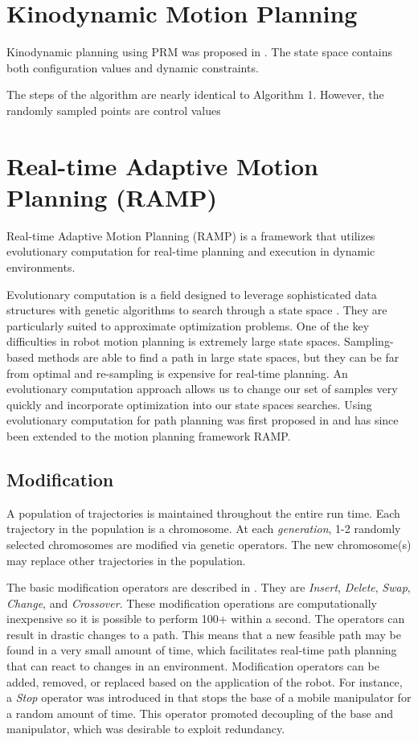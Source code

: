 \documentclass[10pt,conference]{ieeeconf}
\begin{document}
\section{ Kinodynamic Motion Planning }


Kinodynamic planning using PRM was proposed in \cite{hsu2002randomized}. The state space contains both configuration values and dynamic constraints.

The steps of the algorithm are nearly identical to Algorithm 1. However, the randomly sampled points are control values


\section{Real-time Adaptive Motion Planning (RAMP)}
	
Real-time Adaptive Motion Planning (RAMP) \cite{RAMP} is a framework that utilizes evolutionary computation for real-time planning and execution in dynamic environments. 

Evolutionary computation is a field designed to leverage sophisticated data structures with genetic algorithms to search through a state space \cite{michalewicz2013genetic}. They are particularly suited to approximate optimization problems. One of the key difficulties in robot motion planning is extremely large state spaces. Sampling-based methods are able to find a path in large state spaces, but they can be far from optimal and re-sampling is expensive for real-time planning. An evolutionary computation approach allows us to change our set of samples very quickly and incorporate optimization into our state spaces searches. Using evolutionary computation for path planning was first proposed in \cite{EPN_Adaptive} and has since been extended to the motion planning framework RAMP.


\subsection{Modification}

A population of trajectories is maintained throughout the entire run time. Each trajectory in the population is a chromosome. At each \emph{generation}, 1-2 randomly selected chromosomes are modified via genetic operators. The new chromosome(s) may replace other trajectories in the population. 

The basic modification operators are described in \cite{EPN_Adaptive}. They are \emph{Insert}, \emph{Delete}, \emph{Swap}, \emph{Change}, and \emph{Crossover}. These modification operations are computationally inexpensive so it is possible to perform 100+ within a second. The operators can result in drastic changes to a path. This means that a new feasible path may be found in a very small amount of time, which facilitates real-time path planning that can react to changes in an environment. Modification operators can be added, removed, or replaced based on the application of the robot. For instance, a \emph{Stop} operator was introduced in \cite{RAMP} that stops the base of a mobile manipulator for a random amount of time. This operator promoted decoupling of the base and manipulator, which was desirable to exploit redundancy. 
\end{document}
